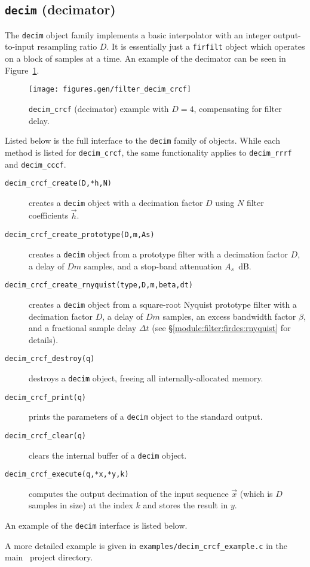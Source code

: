 \subsection{{\tt decim} (decimator)}
\label{module:filter:decim}
The {\tt decim} object family implements a basic interpolator with an
integer output-to-input resampling ratio $D$.
It is essentially just a {\tt firfilt} object which operates on a block
of samples at a time.
An example of the decimator can be seen in
Figure~\ref{fig:module:filter:decim_crcf}.
%
\begin{figure}
\centering
  \texttt{[image: figures.gen/filter\_decim\_crcf]}
\caption{{\tt decim\_crcf} (decimator) example with $D=4$,
         compensating for filter delay.}
\label{fig:module:filter:decim_crcf}
\end{figure}
%
Listed below is the full interface to the {\tt decim} family of
objects.
While each method is listed for {\tt decim\_crcf}, the same
functionality applies to {\tt decim\_rrrf} and {\tt decim\_cccf}.
%
\begin{description}
\item[{\tt decim\_crcf\_create(D,*h,N)}]
    creates a {\tt decim} object with a decimation factor $D$ using $N$
    filter coefficients $\vec{h}$.
\item[{\tt decim\_crcf\_create\_prototype(D,m,As)}]
    creates a {\tt decim} object from a prototype filter with a
    decimation factor $D$,
    a delay of $Dm$ samples, and
    a stop-band attenuation $A_s$~dB.
\item[{\tt decim\_crcf\_create\_rnyquist(type,D,m,beta,dt)}]
    creates a {\tt decim} object from a square-root Nyquist prototype filter with a
    decimation factor $D$,
    a delay of $Dm$ samples,
    an excess bandwidth factor $\beta$, and
    a fractional sample delay $\Delta t$
    (see \S\ref{module:filter:firdes:rnyquist} for details).
\item[{\tt decim\_crcf\_destroy(q)}]
    destroys a {\tt decim} object, freeing all internally-allocated
    memory.
\item[{\tt decim\_crcf\_print(q)}]
    prints the parameters of a {\tt decim} object to the standard
    output.
\item[{\tt decim\_crcf\_clear(q)}]
    clears the internal buffer of a {\tt decim} object.
\item[{\tt decim\_crcf\_execute(q,*x,*y,k)}]
    computes the output decimation of the input sequence $\vec{x}$
    (which is $D$ samples in size) at the index $k$ and stores the
    result in $y$.
\end{description}
%
An example of the {\tt decim} interface is listed below.
%

%
A more detailed example is given in
{\tt examples/decim\_crcf\_example.c}
in the main \liquid\ project directory.


